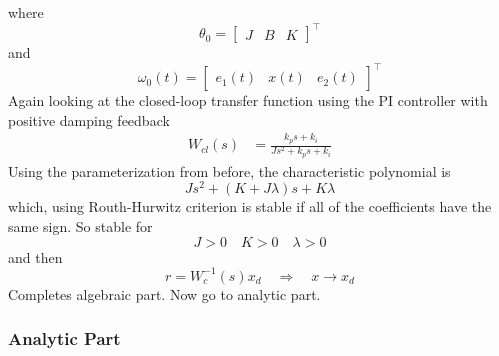where
\begin{equation*}
  \theta_{0}=
  \begin{bmatrix}
    J & B & K
  \end{bmatrix}^{\top}
\end{equation*}
and
\begin{equation*}
  \omega_{0}(t)=
  \begin{bmatrix}
    e_{1}(t) & x(t) & e_{2}(t)
  \end{bmatrix}^{\top}
\end{equation*}
Again looking at the closed-loop transfer function using the PI controller with positive damping feedback
\begin{align*}
  W_{cl}(s)&=\frac{k_{p}s+k_{i}}{Js^{2}+k_{p}s+k_{i}}
\end{align*}
Using the parameterization from before, the characteristic polynomial is
\begin{equation*}
  Js^{2}+(K+J\lambda)s+K\lambda
\end{equation*}
which, using Routh-Hurwitz criterion is stable if all of the coefficients have the same sign.
So stable for
\begin{equation*}
  J>0
  \quad
  K>0
  \quad
  \lambda>0
\end{equation*}
and then
\begin{equation*}
  r=W_{c}^{-1}(s)x_{d}\quad\Rightarrow\quad x\rightarrow x_{d}
\end{equation*}
Completes algebraic part.
Now go to analytic part.

\subsubsection{Analytic Part}


